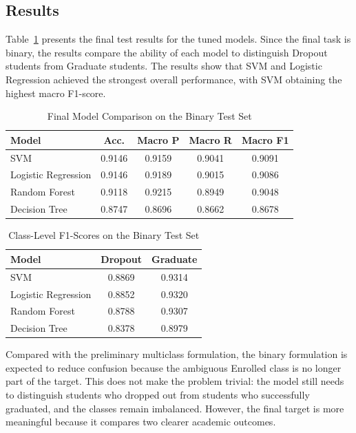 \documentclass[lettersize,journal]{IEEEtran}
\begin{document}
\subsection{Results}
Table~\ref{tab:model_comparison} presents the final test results for the tuned models. Since the final task is binary, the results compare the ability of each model to distinguish Dropout students from Graduate students. The results show that SVM and Logistic Regression achieved the strongest overall performance, with SVM obtaining the highest macro F1-score.

\begin{table}[!t]
\caption{Final Model Comparison on the Binary Test Set}
\label{tab:model_comparison}
\centering
\footnotesize
\begin{tabular}{lcccc}
\toprule
Model & Acc. & Macro P & Macro R & Macro F1 \\
\midrule
SVM & 0.9146 & 0.9159 & 0.9041 & 0.9091 \\
Logistic Regression & 0.9146 & 0.9189 & 0.9015 & 0.9086 \\
Random Forest & 0.9118 & 0.9215 & 0.8949 & 0.9048 \\
Decision Tree & 0.8747 & 0.8696 & 0.8662 & 0.8678 \\
\bottomrule
\end{tabular}
\end{table}

\begin{table}[!t]
\caption{Class-Level F1-Scores on the Binary Test Set}
\label{tab:class_f1}
\centering
\footnotesize
\begin{tabular}{lcc}
\toprule
Model & Dropout & Graduate \\
\midrule
SVM & 0.8869 & 0.9314 \\
Logistic Regression & 0.8852 & 0.9320 \\
Random Forest & 0.8788 & 0.9307 \\
Decision Tree & 0.8378 & 0.8979 \\
\bottomrule
\end{tabular}
\end{table}

Compared with the preliminary multiclass formulation, the binary formulation is expected to reduce confusion because the ambiguous Enrolled class is no longer part of the target. This does not make the problem trivial: the model still needs to distinguish students who dropped out from students who successfully graduated, and the classes remain imbalanced. However, the final target is more meaningful because it compares two clearer academic outcomes.
\end{document}
